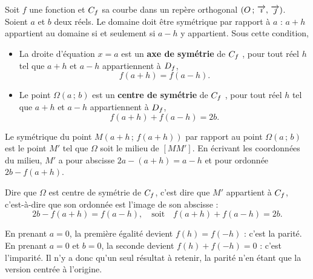 \begin{propriete}
Soit $f$ une fonction et $C_{f}$ sa courbe dans un repère orthogonal
$\left(O\,;\,\overrightarrow{\imath},\,\overrightarrow{\jmath}\right)$. Soient $a$ et $b$ deux réels. Le domaine doit être symétrique par rapport à $a$ : $a+h$ appartient au domaine si et seulement si $a-h$ y appartient. Sous cette condition,
\begin{itemize}[leftmargin=1.6em, itemsep=0.2em]
  \item La droite d'équation $x = a$ est un \textbf{axe de symétrie} de
        $C_{f}$ \ssi, pour tout réel $h$ tel que $a+h$ et $a-h$
        appartiennent à $D_{f}$,
        \[ f(a+h) = f(a-h). \]
  \item Le point $\Omega(a\,;\,b)$ est un \textbf{centre de symétrie} de
        $C_{f}$ \ssi, pour tout réel $h$ tel que $a+h$ et $a-h$
        appartiennent à $D_{f}$,
        \[ f(a+h) + f(a-h) = 2b. \]
\end{itemize}
\end{propriete}

\begin{demonstration}
Le symétrique du point $M(a+h\,;\,f(a+h))$ par rapport au point
$\Omega(a\,;\,b)$ est le point $M'$ tel que $\Omega$ soit le milieu de
$[MM']$. En écrivant les coordonnées du milieu, $M'$ a pour abscisse
$2a - (a+h) = a - h$ et pour ordonnée $2b - f(a+h)$.

Dire que $\Omega$ est centre de symétrie de $C_{f}$, c'est dire que $M'$
appartient à $C_{f}$, c'est-à-dire que son ordonnée est l'image de son
abscisse :
\[
  2b - f(a+h) = f(a-h),
  \quad\text{soit}\quad
  f(a+h) + f(a-h) = 2b .
\]
\end{demonstration}

\begin{remarque}
En prenant $a = 0$, la première égalité devient $f(h) = f(-h)$ : c'est la
parité. En prenant $a = 0$ et $b = 0$, la seconde devient
$f(h) + f(-h) = 0$ : c'est l'imparité. Il n'y a donc qu'un seul résultat à
retenir, la parité n'en étant que la version centrée à l'origine.
\end{remarque}

